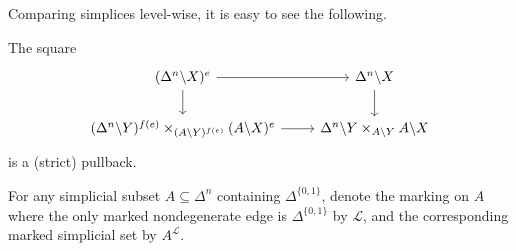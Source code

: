 \documentclass[main.tex]{subfiles}
\begin{document}
Comparing simplices level-wise, it is easy to see the following.
\begin{lemma}
  \label{lemma:unmarked_pullback}
  The square
  \begin{equation*}
    \begin{tikzcd}
      (\Delta^{n} \backslash X)^{e}
      \arrow[r]
      \arrow[d]
      & \Delta^{n} \backslash X
      \arrow[d]
      \\
      (\Delta^{n} \backslash Y)^{f(e)} \times_{(A \backslash Y)^{f(e)}} (A \backslash X)^{e}
      \arrow[r]
      & \Delta^{n} \backslash Y \times_{A\backslash Y} A \backslash X
    \end{tikzcd}
  \end{equation*}
  is a (strict) pullback.
\end{lemma}

\begin{definition}
  For any simplicial subset $A \subseteq \Delta^{n}$ containing $\Delta^{\{0, 1\}}$, denote the marking on $A$ where the only marked nondegenerate edge is $\Delta^{\{0, 1\}}$ by $\mathcal{L}$, and the corresponding marked simplicial set by $A^{\mathcal{L}}$.
\end{definition}
\end{document}
